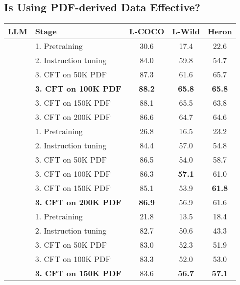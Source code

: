 \subsection{Is Using PDF-derived Data Effective?}
\begin{table}[t]
    \centering
    \begin{adjustbox}{width=\linewidth}
    \begin{tabular}{@{}clccc@{}}
        \toprule
        \textbf{LLM} & \textbf{Stage} & \textbf{L-COCO} & \textbf{L-Wild} &  \textbf{Heron} \\
        \midrule
        \parbox[t]{0mm}{}
        & 1. Pretraining & 30.6 & 17.4 & 22.6 \\ 
        & 2. Instruction tuning & 84.0 & 59.8 & 54.7 \\ 
        & 3. CFT on 50K PDF & 87.3 & 61.6 & 65.7 \\ 
        & \textbf{3. CFT on 100K PDF} & \textbf{88.2} & \textbf{65.8} & \textbf{65.8} \\ 
        & 3. CFT on 150K PDF & 88.1 & 65.5 & 63.8 \\ 
        & 3. CFT on 200K PDF & 86.6 & 64.7 & 64.6 \\ 
        \midrule
        \midrule
        \parbox[t]{0mm}{}
        & 1. Pretraining & 26.8 & 16.5 & 23.2 \\ 
        & 2. Instruction tuning & 84.4 & 57.0 & 54.8 \\ 
        & 3. CFT on 50K PDF & 86.5 & 54.0 & 58.7 \\ 
        & 3. CFT on 100K PDF & 86.3 & \textbf{57.1} & 61.0 \\ 
        & 3. CFT on 150K PDF & 85.1 & 53.9 & \textbf{61.8} \\ 
        & \textbf{3. CFT on 200K PDF} & \textbf{86.9} & 56.9 & 61.6 \\ 
        \midrule
        \midrule
        \parbox[t]{0mm}{}
        & 1. Pretraining & 21.8 & 13.5 & 18.4 \\ 
        & 2. Instruction tuning & 82.7 & 50.6 & 43.3 \\ 
        & 3. CFT on 50K PDF & 83.0 & 52.3 & 51.9 \\ 
        & 3. CFT on 100K PDF & 83.3 & 52.0 & 53.0 \\ 
        & \textbf{3. CFT on 150K PDF} & 83.6 & \textbf{56.7} & \textbf{57.1} \\ 

\end{tabular}
\end{adjustbox}
\end{table}
